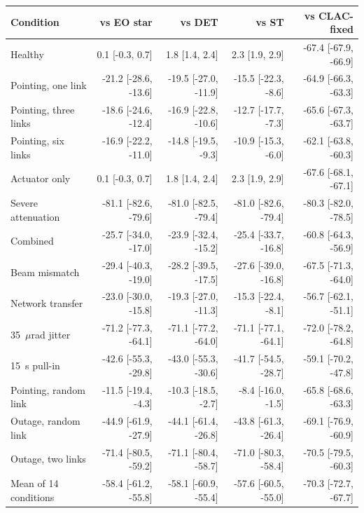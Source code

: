 \begin{tabular}{@{}lrrrr@{}}
\toprule
Condition & vs EO star & vs DET & vs ST & vs CLAC-fixed\\
\midrule
Healthy & 0.1 [-0.3, 0.7] & 1.8 [1.4, 2.4] & 2.3 [1.9, 2.9] & -67.4 [-67.9, -66.9]\\
Pointing, one link & -21.2 [-28.6, -13.6] & -19.5 [-27.0, -11.9] & -15.5 [-22.3, -8.6] & -64.9 [-66.3, -63.3]\\
Pointing, three links & -18.6 [-24.6, -12.4] & -16.9 [-22.8, -10.6] & -12.7 [-17.7, -7.3] & -65.6 [-67.3, -63.7]\\
Pointing, six links & -16.9 [-22.2, -11.0] & -14.8 [-19.5, -9.3] & -10.9 [-15.3, -6.0] & -62.1 [-63.8, -60.3]\\
Actuator only & 0.1 [-0.3, 0.7] & 1.8 [1.4, 2.4] & 2.3 [1.9, 2.9] & -67.6 [-68.1, -67.1]\\
Severe attenuation & -81.1 [-82.6, -79.6] & -81.0 [-82.5, -79.4] & -81.0 [-82.6, -79.4] & -80.3 [-82.0, -78.5]\\
Combined & -25.7 [-34.0, -17.0] & -23.9 [-32.4, -15.2] & -25.4 [-33.7, -16.8] & -60.8 [-64.3, -56.9]\\
Beam mismatch & -29.4 [-40.3, -19.0] & -28.2 [-39.5, -17.5] & -27.6 [-39.0, -16.8] & -67.5 [-71.3, -64.0]\\
Network transfer & -23.0 [-30.0, -15.8] & -19.3 [-27.0, -11.3] & -15.3 [-22.4, -8.1] & -56.7 [-62.1, -51.1]\\
35~$\mu$rad jitter & -71.2 [-77.3, -64.1] & -71.1 [-77.2, -64.0] & -71.1 [-77.1, -64.1] & -72.0 [-78.2, -64.8]\\
15~s pull-in & -42.6 [-55.3, -29.8] & -43.0 [-55.3, -30.6] & -41.7 [-54.5, -28.7] & -59.1 [-70.2, -47.8]\\
Pointing, random link & -11.5 [-19.4, -4.3] & -10.3 [-18.5, -2.7] & -8.4 [-16.0, -1.5] & -65.8 [-68.6, -63.3]\\
Outage, random link & -44.9 [-61.9, -27.9] & -44.1 [-61.4, -26.8] & -43.8 [-61.3, -26.4] & -69.1 [-76.9, -60.9]\\
Outage, two links & -71.4 [-80.5, -59.2] & -71.1 [-80.4, -58.7] & -71.0 [-80.3, -58.4] & -70.5 [-79.5, -60.3]\\
\midrule
Mean of 14 conditions & -58.4 [-61.2, -55.8] & -58.1 [-60.9, -55.4] & -57.6 [-60.5, -55.0] & -70.3 [-72.7, -67.7]\\
\bottomrule
\end{tabular}
